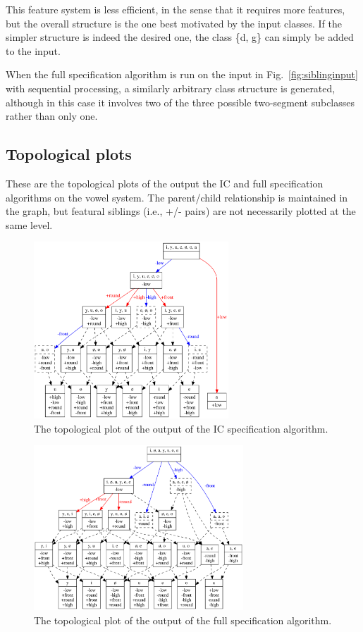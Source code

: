 \documentclass[12pt, oneside]{article}   	%
\begin{document}
This feature system is less efficient, in the sense that it requires more features, but the overall structure is the one best motivated by the input classes. If the simpler structure is indeed the desired one, the class \{d, g\} can simply be added to the input.

When the full specification algorithm is run on the input in Fig.~\ref{fig:siblinginput} with sequential processing, a similarly arbitrary class structure is generated, although in this case it involves two of the three possible two-segment subclasses rather than only one.

\subsection{Topological plots}
\label{app:topological}

These are the topological plots of the output the IC and full specification algorithms on the vowel system. The parent/child relationship is maintained in the graph, but featural siblings (i.e., +/- pairs) are not necessarily plotted at the same level.

\begin{figure}[htb!]
	\centering
	\includegraphics[width=0.65\textwidth]{vowel_inventory_ic_TOPOLOGICAL.png}
	\caption{The topological plot of the output of the IC specification algorithm.}
	\label{fig:vowel_inventory_ic_topological}
\end{figure}

\begin{figure}[htb!]
\centering
\includegraphics[width=0.7\textwidth]{vowel_inventory_full_TOPOLOGICAL.png}
\caption{The topological plot of the output of the full specification algorithm.}
\label{fig:vowelfulltopological}
\end{figure}



\end{document}
